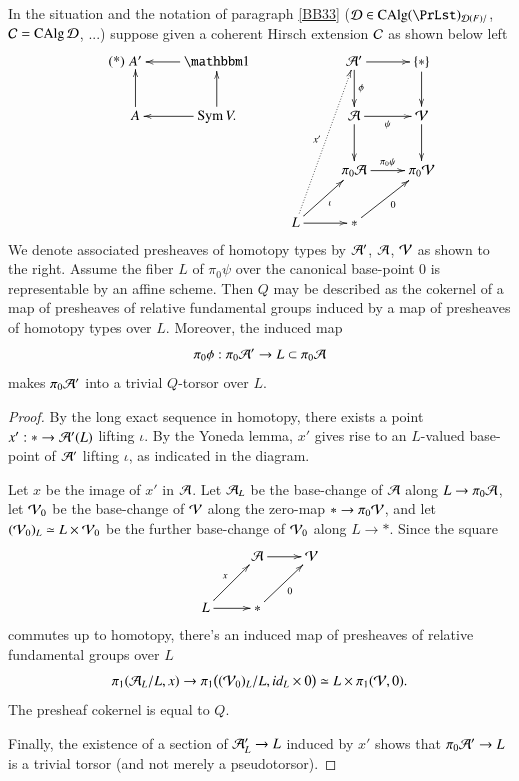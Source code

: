 \begin{ssProposition}
\label{MM55}
In the situation and the notation of paragraph \ref{BB33} ($\Dd \in  \CAlg (\PrLst)_{\Dd(F)/}$, $\mathcal{C} = \operatorname{CAlg} \mathcal{D}$, ...) suppose given a coherent Hirsch extension $\mathcal{C}$ as shown below left
\[
\tag{*}
\xymatrix{
A'   & \one \ar[l]
&&
\Aa' \ar[d]^-{\phi} \ar[r] & \{\ast\} \ar[d] 
\\
A \ar[u] & \Sym V. \ar[l] \ar[u]
&&
\Aa \ar[r]_-\psi \ar[d] & \Vv \ar[d]
\\
&
&
& \pi_0 \Aa \ar[r]^-{\pi_0\psi} & \pi_0 \Vv
\\
&&
L \ar@{.>}[uuur]^-{x'} \ar[ur]_\iota \ar[r] &
\ast \ar[ur]_0
}
\]
We denote associated presheaves of homotopy types by $\mathcal{A}'$, $\mathcal{A}$, $\mathcal{V}$ as shown to the right. Assume the fiber $L$ of $\pi_0\psi$ over the canonical base-point $0$ is representable by an affine scheme. Then $Q$ may be described as the cokernel of a map of presheaves of relative fundamental groups induced by a map of presheaves of homotopy types over $L$. Moreover, the induced map
\[
\pi_0 \phi: \pi_0 \mathcal{A}' \to L \subset \pi_0 \mathcal{A}
\]
makes $\pi_0 \mathcal{A}'$ into a trivial $Q$-torsor over $L$.
\end{ssProposition}

\begin{proof}
By the long exact sequence in homotopy, there exists a point $x': \ast \to \mathcal{A}'(L)$ lifting $\iota$. By the Yoneda lemma, $x'$ gives rise to an $L$-valued base-point of $\mathcal{A}'$ lifting $\iota$, as indicated in the diagram. 

Let $x$ be the image of $x'$ in $\mathcal{A}$. Let $\mathcal{A}_L$ be the base-change of $\mathcal{A}$ along $L \to \pi_0\mathcal{A}$, let $\mathcal{V}_0$ be the base-change of $\mathcal{V}$ along the zero-map $\ast \to \pi_0\mathcal{V}$, and let $(\mathcal{V}_0)_L \simeq L \times \mathcal{V}_0$ be the further base-change of $\mathcal{V}_0$ along $L \to \ast$. Since the square
\[
\xymatrix{
& \Aa \ar[r] & \Vv
\\
L \ar[ur]^-{x} \ar[r] & \ast \ar[ur]_-0
}
\]
commutes up to homotopy, there's an induced map of presheaves of relative fundamental groups over $L$
\[
\pi_1( \mathcal{A}_L / L , x)
\to
\pi_1\big( (\mathcal{V}_0)_L / L, id_L \times 0 \big)
\simeq
L \times \pi_1(\mathcal{V}, 0).
\]
The presheaf cokernel is equal to $Q$.

Finally, the existence of a section of $\mathcal{A}'_L \to L$ induced by $x'$ shows that $\pi_0\mathcal{A}' \to L$ is a trivial torsor (and not merely a pseudotorsor). 
\end{proof}

